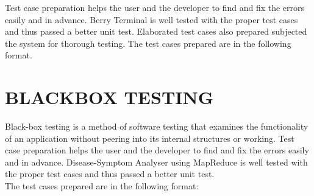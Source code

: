 \documentclass[12pt,a4paper,oneside]{report}
\begin{document}
\par Test case preparation helps the user and the developer to find and fix the errors easily and in advance. Berry Terminal is well tested with the proper test cases and thus passed a better unit test. Elaborated test cases also prepared subjected the system for thorough testing. The test cases prepared are in the following format.\\


\section{BLACKBOX TESTING}
\par Black-box testing is a method of software testing that examines the functionality of an application without peering into its internal structures or working. Test case preparation helps the user and the developer to find and fix the errors easily and in advance. Disease-Symptom Analyser using MapReduce is well tested with the proper test cases and thus passed a better unit test.\\
 The test cases prepared are in the following format:\\
 \\
\end{document}
